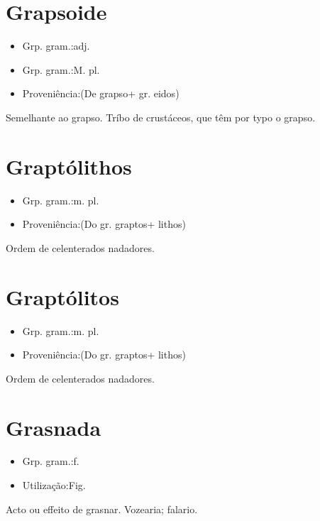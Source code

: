 \section{Grapsoide}
\begin{itemize}
\item {Grp. gram.:adj.}
\end{itemize}
\begin{itemize}
\item {Grp. gram.:M. pl.}
\end{itemize}
\begin{itemize}
\item {Proveniência:(De \textunderscore grapso\textunderscore  + gr. \textunderscore eidos\textunderscore )}
\end{itemize}
Semelhante ao grapso.
Tríbo de crustáceos, que têm por typo o grapso.
\section{Graptólithos}
\begin{itemize}
\item {Grp. gram.:m. pl.}
\end{itemize}
\begin{itemize}
\item {Proveniência:(Do gr. \textunderscore graptos\textunderscore  + \textunderscore lithos\textunderscore )}
\end{itemize}
Ordem de celenterados nadadores.
\section{Graptólitos}
\begin{itemize}
\item {Grp. gram.:m. pl.}
\end{itemize}
\begin{itemize}
\item {Proveniência:(Do gr. \textunderscore graptos\textunderscore  + \textunderscore lithos\textunderscore )}
\end{itemize}
Ordem de celenterados nadadores.
\section{Grasnada}
\begin{itemize}
\item {Grp. gram.:f.}
\end{itemize}
\begin{itemize}
\item {Utilização:Fig.}
\end{itemize}
Acto ou effeito de grasnar.
Vozearia; falario.
